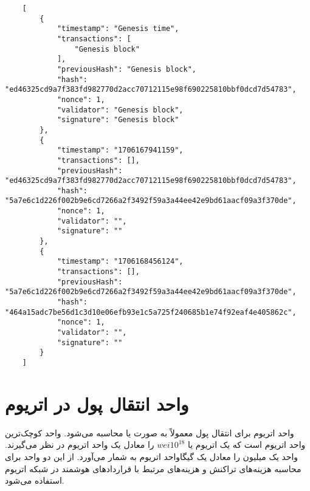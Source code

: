 \documentclass[10pt, a4paper]{article}
\begin{document}
\begin{LTR}
    \begin{lstlisting}
    [
        {
            "timestamp": "Genesis time",
            "transactions": [
                "Genesis block"
            ],
            "previousHash": "Genesis block",
            "hash": "ed46325cd9a7f383fd982770d2acc70712115e98f690225810bbf0dcd7d54783",
            "nonce": 1,
            "validator": "Genesis block",
            "signature": "Genesis block"
        },
        {
            "timestamp": "1706167941159",
            "transactions": [],
            "previousHash": "ed46325cd9a7f383fd982770d2acc70712115e98f690225810bbf0dcd7d54783",
            "hash": "5a7e6c1d226f002b9e6cd7266a2f3492f59a3a44ee42e9bd61aacf09a3f370de",
            "nonce": 1,
            "validator": "",
            "signature": ""
        },
        {
            "timestamp": "1706168456124",
            "transactions": [],
            "previousHash": "5a7e6c1d226f002b9e6cd7266a2f3492f59a3a44ee42e9bd61aacf09a3f370de",
            "hash": "464a15adc7be56d1c3d10e06efb93e1c5a725f240685b1e74f92eaf4e405862c",
            "nonce": 1,
            "validator": "",
            "signature": ""
        }
    ]
    \end{lstlisting}
\end{LTR}

\section{واحد انتقال پول در اتریوم}

واحد اتریوم برای انتقال پول معمولاً به صورت  یا  محاسبه
می‌شود. واحد  کوچک‌ترین واحد اتریوم است که یک اتریوم یا $wei 10^{18}$ را
معادل یک واحد اتریوم در نظر می‌گیرند. واحد  یک میلیون  را معادل
یک گیگاواحد اتریوم به شمار می‌آورد. از این دو واحد برای محاسبه هزینه‌های تراکنش
و هزینه‌های مرتبط با قرارداد‌های هوشمند در شبکه اتریوم استفاده می‌شود.
\end{document}
